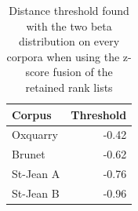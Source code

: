 \begin{table}
  \centering
  \caption{Distance threshold found with the two beta distribution on every corpora when using the z-score fusion of the retained rank lists}
  \label{tab:semi_supervised_clustering_thresholds}

  \begin{tabular}{l r}
    \toprule
    Corpus & Threshold \\
    \midrule
    Oxquarry & -0.42 \\
    Brunet & -0.62 \\
    St-Jean A & -0.76 \\
    St-Jean B & -0.96 \\
    \bottomrule
  \end{tabular}
\end{table}

